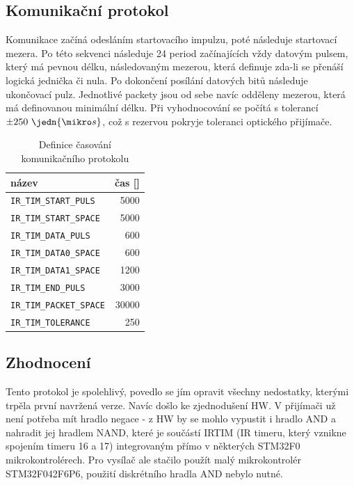 \subsection{Komunikační protokol}
Komunikace začíná odesláním startovacího impulzu, poté následuje startovací mezera. Po této sekvenci následuje 24 period začínajících vždy datovým pulsem, který má pevnou délku, následovaným mezerou, která definuje zda-li se přenáší logická jednička či nula. Po dokončení posílání datových bitů následuje ukončovací pulz. Jednotlivé packety jsou od sebe navíc odděleny mezerou, která má definovanou minimální délku. Při vyhodnocování se počítá s tolerancí $\pm250~\jedn{\mikro s}$, což s rezervou pokryje toleranci optického přijímače.

\begin{table}[H]
  \caption{Definice časování komunikačního protokolu}
  \begin{center}
  	\small
	  \begin{tabular}{|l|r|}
	    \hline
	    \textbf{název} & \textbf{čas [\jedn{\mikro s}]} \\\hline\hline
	    \texttt{IR\_TIM\_START\_PULS}       &  5000     \\\hline
	    \texttt{IR\_TIM\_START\_SPACE}      &  5000     \\\hline
	    \texttt{IR\_TIM\_DATA\_PULS}        &   600     \\\hline
	    \texttt{IR\_TIM\_DATA0\_SPACE}      &   600     \\\hline
        \texttt{IR\_TIM\_DATA1\_SPACE}      &  1200     \\\hline
        \texttt{IR\_TIM\_END\_PULS}         &  3000     \\\hline
        \texttt{IR\_TIM\_PACKET\_SPACE}     & 30000     \\\hline
        \texttt{IR\_TIM\_TOLERANCE}         &   250     \\\hline
	  \end{tabular}
  \end{center}
\end{table}



\subsection{Zhodnocení}
Tento protokol je spolehlivý, povedlo se jím opravit všechny nedostatky, kterými trpěla první navržená verze. Navíc došlo ke zjednodušení HW. V přijímači už není potřeba mít hradlo negace - z HW by se mohlo vypustit i hradlo AND a nahradit jej hradlem NAND, které je součástí IRTIM (IR timeru, který vznikne spojením timeru 16 a 17) integrovaným přímo v některých STM32F0 mikrokontrolérech. Pro vysílač ale stačilo použít malý mikrokontrolér STM32F042F6P6, použití diskrétního hradla AND nebylo nutné.

